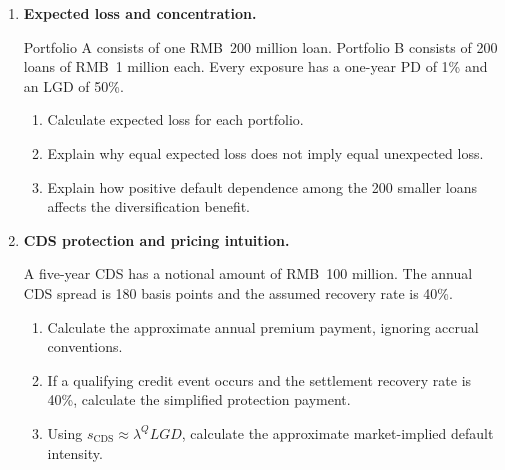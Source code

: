 \begin{enumerate}
\begin{enumerate}

\item Calculate EAD using Equation~\eqref{eq:ch19-ead-credit-line}.

\item Calculate expected loss if PD is 2.5\% and LGD is 40\%.

\item Explain why the credit conversion factor may increase as the borrower's financial condition deteriorates.

\end{enumerate}

\item \textbf{Expected loss and concentration.}

Portfolio A consists of one RMB~200 million loan. Portfolio B consists of 200 loans of RMB~1 million each. Every exposure has a one-year PD of 1\% and an LGD of 50\%.

\begin{enumerate}

\item Calculate expected loss for each portfolio.

\item Explain why equal expected loss does not imply equal unexpected loss.

\item Explain how positive default dependence among the 200 smaller loans affects the diversification benefit.

\end{enumerate}

\item \textbf{CDS protection and pricing intuition.}

A five-year CDS has a notional amount of RMB~100 million. The annual CDS spread is 180 basis points and the assumed recovery rate is 40\%.

\begin{enumerate}

\item Calculate the approximate annual premium payment, ignoring accrual conventions.

\item If a qualifying credit event occurs and the settlement recovery rate is 40\%, calculate the simplified protection payment.

\item Using \(s_{\mathrm{CDS}}\approx\lambda^{Q}LGD\), calculate the approximate market-implied default intensity.


\end{enumerate}
\end{enumerate}

